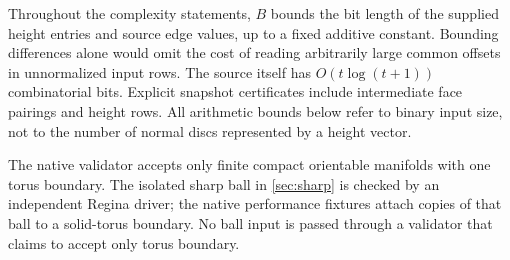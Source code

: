 Throughout the complexity statements, $B$ bounds the bit length of the supplied
height entries and source edge values, up to a fixed additive constant.
Bounding differences alone would omit the cost of reading arbitrarily large
common offsets in unnormalized input rows. The source itself has
$O(t\log(t+1))$ combinatorial bits. Explicit snapshot certificates include
intermediate face pairings and height rows. All arithmetic bounds below
refer to binary input size, not to the number of normal discs represented
by a height vector.

The native validator accepts only finite compact orientable manifolds with
one torus boundary. The isolated sharp ball in \cref{sec:sharp} is checked by
an independent Regina driver; the native performance fixtures attach copies
of that ball to a solid-torus boundary. No ball input is passed through a
validator that claims to accept only torus boundary.
